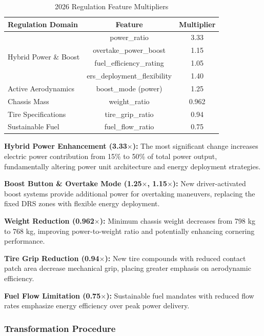 \documentclass[conference]{IEEEtran}
\begin{document}
\begin{table}[h]
\centering
\caption{2026 Regulation Feature Multipliers}
\begin{tabular}{lcc}
\toprule
\textbf{Regulation Domain} & \textbf{Feature} & \textbf{Multiplier} \\
\midrule
\multirow{4}{*}{Hybrid Power \& Boost} & power\_ratio & 3.33 \\
& overtake\_power\_boost & 1.15 \\
& fuel\_efficiency\_rating & 1.05 \\
& ers\_deployment\_flexibility & 1.40 \\
\midrule
Active Aerodynamics & boost\_mode (power) & 1.25 \\
\midrule
Chassis Mass & weight\_ratio & 0.962 \\
\midrule
Tire Specifications & tire\_grip\_ratio & 0.94 \\
\midrule
Sustainable Fuel & fuel\_flow\_ratio & 0.75 \\
\bottomrule
\end{tabular}
\label{tab:regulation_multipliers}
\end{table}

\textbf{Hybrid Power Enhancement (3.33$\times$):} The most significant change increases electric power contribution from 15\% to 50\% of total power output, fundamentally altering power unit architecture and energy deployment strategies.

\textbf{Boost Button \& Overtake Mode (1.25$\times$, 1.15$\times$):} New driver-activated boost systems provide additional power for overtaking maneuvers, replacing the fixed DRS zones with flexible energy deployment.

\textbf{Weight Reduction (0.962$\times$):} Minimum chassis weight decreases from 798 kg to 768 kg, improving power-to-weight ratio and potentially enhancing cornering performance.

\textbf{Tire Grip Reduction (0.94$\times$):} New tire compounds with reduced contact patch area decrease mechanical grip, placing greater emphasis on aerodynamic efficiency.

\textbf{Fuel Flow Limitation (0.75$\times$):} Sustainable fuel mandates with reduced flow rates emphasize energy efficiency over peak power delivery.

\subsubsection{Transformation Procedure}
\end{document}

